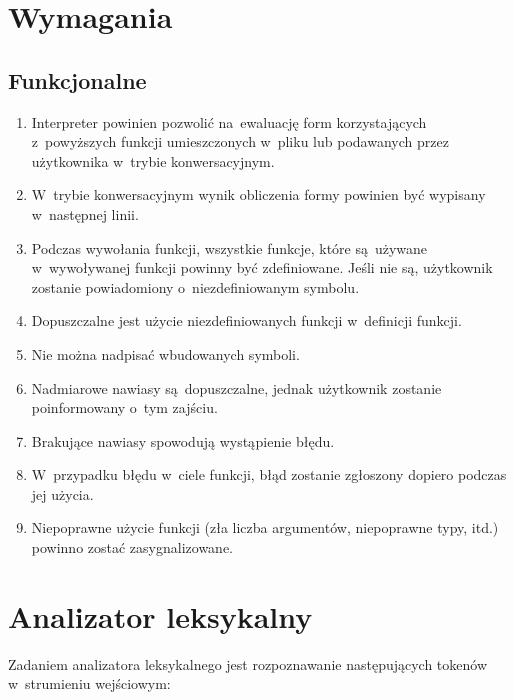 \documentclass[a4paper,11pt]{article}
\begin{document}
\section{Wymagania}

\subsection{Funkcjonalne}

\begin{enumerate}
\item Interpreter powinien pozwolić na~ewaluację form korzystających
  z~powyższych funkcji umieszczonych w~pliku lub podawanych przez użytkownika
  w~trybie konwersacyjnym.
\item W~trybie konwersacyjnym wynik obliczenia formy powinien być wypisany
  w~następnej linii.
\item Podczas wywołania funkcji, wszystkie funkcje, które są~używane
  w~wywoływanej funkcji powinny być zdefiniowane. Jeśli nie są, użytkownik
  zostanie powiadomiony o~niezdefiniowanym symbolu.
\item Dopuszczalne jest użycie niezdefiniowanych funkcji w~definicji funkcji.
\item Nie można nadpisać wbudowanych symboli.
\item Nadmiarowe nawiasy są~dopuszczalne, jednak użytkownik zostanie
  poinformowany o~tym zajściu.
\item Brakujące nawiasy spowodują wystąpienie błędu.
\item W~przypadku błędu w~ciele funkcji, błąd zostanie zgłoszony dopiero
  podczas jej użycia.
\item Niepoprawne użycie funkcji (zła liczba argumentów, niepoprawne typy,
  itd.) powinno zostać zasygnalizowane.
\end{enumerate}

\section{Analizator leksykalny}

Zadaniem analizatora leksykalnego jest rozpoznawanie następujących tokenów
w~strumieniu wejściowym:
\end{document}

